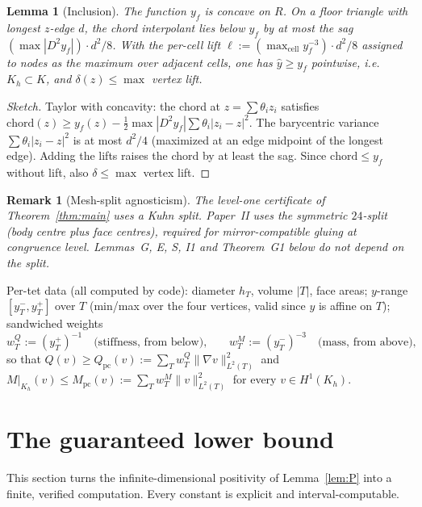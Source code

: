 \documentclass[11pt]{amsart}
\newtheorem{lemma}[theorem]{Lemma}
\newtheorem{remark}[theorem]{Remark}
\begin{document}
\begin{lemma}[Inclusion]\label{lem:G}
The function $y_f$ is concave on $R$.  On a floor triangle with longest
$z$-edge $d$, the chord interpolant lies below $y_f$ by at most the sag
$(\max|D^2 y_f|)\cdot d^2/8$.  With the per-cell lift
$\ell:=(\max_{\mathrm{cell}} y_f^{-3})\cdot d^2/8$ assigned to nodes as
the maximum over adjacent cells, one has $\hat y\ge y_f$ pointwise, i.e.\
$K_h\subset K$, and $\delta(z)\le\max$ vertex lift.
\end{lemma}

\begin{proof}[Sketch]
Taylor with concavity: the chord at $z=\sum\theta_i z_i$ satisfies
$\mathrm{chord}(z)\ge y_f(z)-\tfrac12\max|D^2 y_f|\sum\theta_i|z_i-z|^2$.
The barycentric variance $\sum\theta_i|z_i-z|^2$ is at most $d^2/4$
(maximized at an edge midpoint of the longest edge).  Adding the lifts
raises the chord by at least the sag.  Since $\mathrm{chord}\le y_f$
without lift, also $\delta\le\max$ vertex lift.
\end{proof}

\begin{remark}[Mesh-split agnosticism]
The level-one certificate of Theorem~\ref{thm:main} uses a Kuhn split.
Paper~II uses the symmetric $24$-split (body centre plus face centres),
required for mirror-compatible gluing at congruence level.  Lemmas~G, E,
S, I1 and Theorem~G1 below do not depend on the split.
\end{remark}

Per-tet data (all computed by code): diameter $h_T$, volume $|T|$, face
areas; $y$-range $[y_T^-,y_T^+]$ over $T$ (min/max over the four vertices,
valid since $y$ is affine on $T$); sandwiched weights
\[
  w_T^Q:=(y_T^+)^{-1}\quad\text{(stiffness, from below),}\qquad
  w_T^M:=(y_T^-)^{-3}\quad\text{(mass, from above),}
\]
so that $Q(v)\ge Q_{\mathrm{pc}}(v):=\sum_T w_T^Q\|\nabla v\|_{L^2(T)}^2$ and
$M|_{K_h}(v)\le M_{\mathrm{pc}}(v):=\sum_T w_T^M\|v\|_{L^2(T)}^2$ for every
$v\in H^1(K_h)$.

\section{The guaranteed lower bound}\label{sec:G1}

This section turns the infinite-dimensional positivity of
Lemma~\ref{lem:P} into a finite, verified computation.  Every constant is
explicit and interval-computable.
\end{document}
